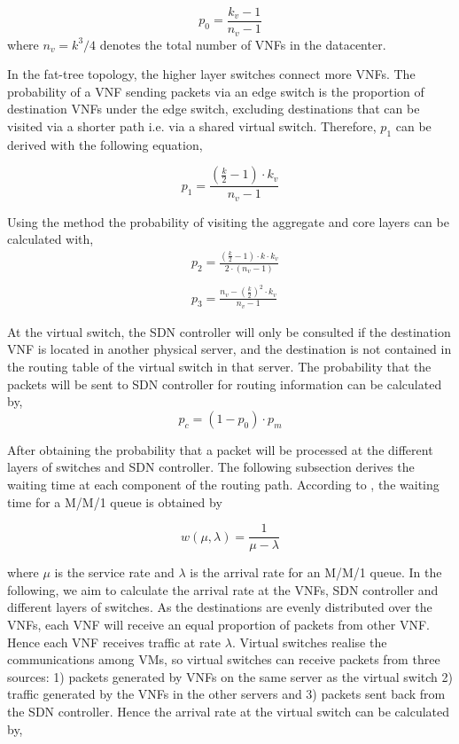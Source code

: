 \begin{equation}
    \label{eq:p_vm}
    p_{0} = \frac{k_{v} - 1}{n_v - 1}
\end{equation}
\noindent where $n_v = k^3/4$ denotes the total number of VNFs in the datacenter.

In the fat-tree topology, the higher layer switches connect more VNFs. The probability of a VNF sending packets via an edge switch is the proportion of destination VNFs under the edge switch, excluding destinations that can be visited via a shorter path i.e. via a shared virtual switch. Therefore, $p_1$ can be derived with the following equation,

\begin{equation}
    \label{eq:p_edge}
    p_{1} = \frac{\left(\frac{k}{2}-1\right) \cdot k_v}{n_v - 1}
\end{equation}

Using the method the probability of visiting the aggregate and core layers can be calculated with,
\begin{align}
    \label{eq:p_agg_core}
     & p_{2} = \frac{\left(\frac{k}{2}-1\right)\cdot k \cdot k_v }{2 \cdot (n_v-1) } \\ \nonumber \\
     & p_{3} = \frac{n_v - \left(\frac{k}{2}\right)^2 \cdot k_{v}}{n_v - 1}
\end{align}

At the virtual switch, the SDN controller will only be consulted if the destination VNF is located in another physical server, and the destination is not contained in the routing table of the virtual switch in that server. The probability that the packets will be sent to SDN controller for routing information can be calculated by,
\begin{equation}
    \label{eq:p_sdn}
    p_{c} = (1 - p_{0}) \cdot p_m
\end{equation}

After obtaining the probability that a packet will be processed at the different layers of switches and SDN controller. The following subsection derives the waiting time at each component of the routing path. According to \cite{Kleinrock75}, the waiting time for a M/M/1 queue is obtained by

\begin{equation}
    \label{eq:p_latency}
    w(\mu, \lambda) = \frac{1}{\mu - \lambda}
\end{equation}

where $\mu$ is the service rate and $\lambda$ is the arrival rate for an M/M/1 queue. In the following, we aim to calculate the arrival rate at the VNFs, SDN controller and different layers of switches. As the destinations are evenly distributed over the VNFs, each VNF will receive an equal proportion of packets from other VNF. Hence each VNF receives traffic at rate $\lambda$. Virtual switches realise the communications among VMs, so virtual switches can receive packets from three sources: 1) packets generated by VNFs on the same server as the virtual switch 2) traffic generated by the VNFs in the other servers and 3) packets sent back from the SDN controller. Hence the arrival rate at the virtual switch can be calculated by,

